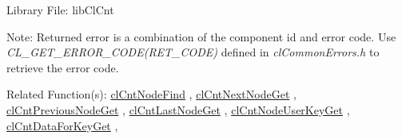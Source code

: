 \begin{Desc}
\item[Library File:]lib\-Cl\-Cnt\end{Desc}
\begin{Desc}
\item[Note:]Returned error is a combination of the component id and error code. Use \textit{CL\_\-GET\_\-ERROR\_\-CODE(RET\_\-CODE)} defined in \textit{clCommonErrors.h} to retrieve the error code.\end{Desc}
\begin{Desc}
\item[Related Function(s):]\hyperlink{pagecnt109}{cl\-Cnt\-Node\-Find} , \hyperlink{pagecnt112}{cl\-Cnt\-Next\-Node\-Get} , 
\hyperlink{pagecnt113}{cl\-Cnt\-Previous\-Node\-Get} , \hyperlink{pagecnt111}{cl\-Cnt\-Last\-Node\-Get} , 
\hyperlink{pagecnt115}{cl\-Cnt\-Node\-User\-Key\-Get} , \hyperlink{pagecnt116}{cl\-Cnt\-Data\-For\-Key\-Get} , 
\end{Desc}


\newpage
